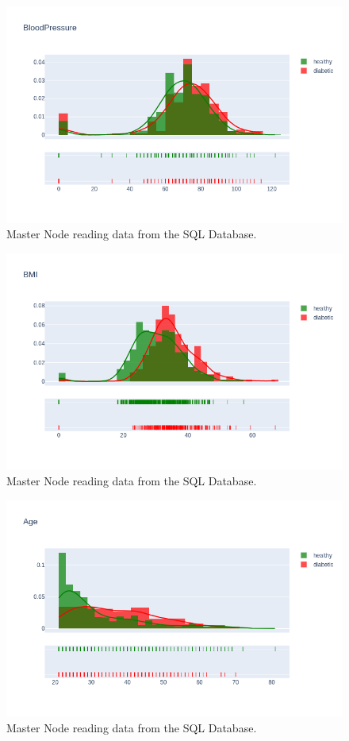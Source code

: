 \documentclass[12pt]{article}
\begin{document}
\begin{figure}[ht]
\centering
\includegraphics[width=1\textwidth]{newplot(7).png}
\caption{Master Node reading data from the SQL Database.}
\end{figure}

\begin{figure}[ht]
\centering
\includegraphics[width=1\textwidth]{newplot(8).png}
\caption{Master Node reading data from the SQL Database.}
\end{figure}

\begin{figure}[ht]
\centering
\includegraphics[width=1\textwidth]{newplot(9).png}
\caption{Master Node reading data from the SQL Database.}
\end{figure}
\end{document}
